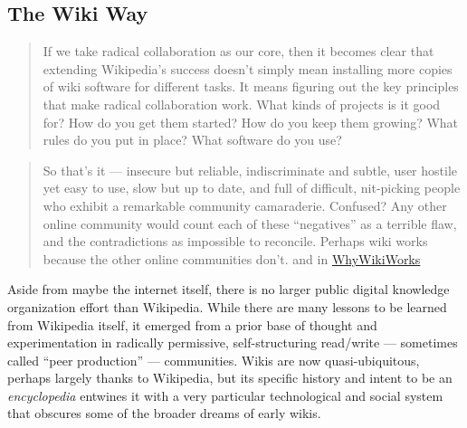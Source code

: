 \hypertarget{the-wiki-way}{%
\subsection{The Wiki Way}\label{the-wiki-way}}

\begin{quote}
If we take radical collaboration as our core, then it becomes clear that
extending Wikipedia's success doesn't simply mean installing more copies
of wiki software for different tasks. It means figuring out the key
principles that make radical collaboration work. What kinds of projects
is it good for? How do you get them started? How do you keep them
growing? What rules do you put in place? What software do you use? \citep{swartzMakingMoreWikipedias2006} 
\end{quote}

\begin{quote}
So that's it --- insecure but reliable, indiscriminate and subtle, user
hostile yet easy to use, slow but up to date, and full of difficult,
nit-picking people who exhibit a remarkable community camaraderie.
Confused? Any other online community would count each of these
``negatives'' as a terrible flaw, and the contradictions as impossible
to reconcile. Perhaps wiki works because the other online communities
don't. \citep{leufWikiWayQuick2001a, -l, 329}  and in
\href{http://wiki.c2.com/?WhyWikiWorks}{WhyWikiWorks}
\end{quote}

Aside from maybe the internet itself, there is no larger public digital
knowledge organization effort than Wikipedia. While there are many
lessons to be learned from Wikipedia itself, it emerged from a prior
base of thought and experimentation in radically permissive,
self-structuring read/write --- sometimes called ``peer production''
\citep{hillWikipediaEndOpen2019}  --- communities. Wikis are now
quasi-ubiquitous,
perhaps largely thanks to Wikipedia, but its specific history and intent
to be an \emph{encyclopedia} entwines it with a very particular
technological and social system that obscures some of the broader dreams
of early wikis.

